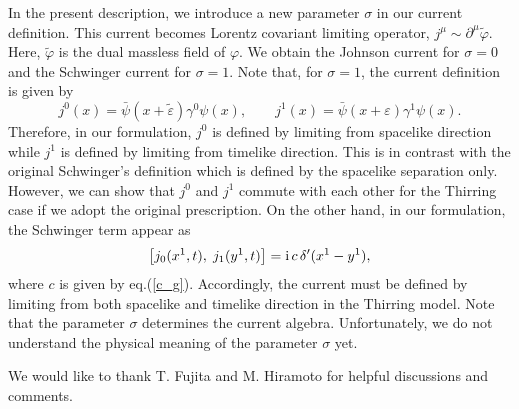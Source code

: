 \documentclass[a4paper,fleqn]{article}
\begin{document}
In the present description, we introduce a new parameter $\sigma$ in our current definition.
This current becomes Lorentz covariant limiting operator,
 $j^\mu \sim \partial^\mu \widetilde\varphi$. 
Here, $\widetilde\varphi$ is the dual massless field of $\varphi$\cite{abd2_rot}.
We obtain the Johnson current for $\sigma=0$ and the Schwinger current for $\sigma=1$. 
Note that, for $\sigma=1$, the current definition is given by
\begin{equation}
j^0 (x) = \bar{\psi}(x+\widetilde\varepsilon) \gamma^0 \psi(x), \quad \quad
j^1 (x) = \bar{\psi}(x+\varepsilon) \gamma^1 \psi(x).
\end{equation}
Therefore, in our formulation, $j^0$ is defined by limiting from spacelike direction
while $j^1$ is defined by limiting from timelike direction.
This is in contrast with the original Schwinger's definition \cite{sch59} which 
is defined by the spacelike separation only.
 However, we can show that $j^0$ and $j^1$ commute with each other for the Thirring case
 if we adopt the original prescription.
On the other hand, in our formulation, the Schwinger term \cite{got_ima,sch59} appear as
\begin{equation}
\left[j_0(x^1,t), \;j_1(y^1, t) \right] = {\rm i} \,c \, \delta^\prime (x^1 - y^1),
\end{equation}
where $c$ is given by eq.(\ref{c_g}).
Accordingly, the current must be defined by limiting from both spacelike and 
timelike direction in the Thirring model. Note that the parameter $\sigma$ determines
the current algebra.
Unfortunately, we do not understand the physical meaning of the parameter $\sigma$ yet.

\vspace{1cm}
\hspace{-5mm}{\bf ACKNOWLEDGMENTS}

\vspace{5mm}
We would like to thank T. Fujita and M. Hiramoto for helpful discussions and comments.
\end{document}
